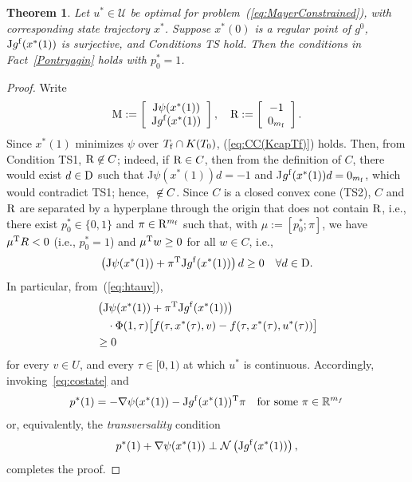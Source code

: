 \documentclass[letterpaper,10pt,conference]{ieeeconf}
\def\R{{\mathbb{R}}}
\newtheorem{theorem}{Theorem} %
\begin{document}
\noindent
\begin{theorem}
\label{thm:abnormal}
Let $u^*\in\mathcal U$ be optimal for problem~(\ref{eq:MayerConstrained}), 
with corresponding state trajectory $x^*$.   
Suppose $x^*(0)$ is a regular point of $g^0$, ${\rm J}g^{\rm f}(x^*(1))$
is surjective, and Conditions TS hold.  
Then the conditions in Fact~\ref{Pontryagin} holds with $p_0^*=1$.
\end{theorem}

\begin{proof}
Write 
\[
{\rm M}:= \left[
      \begin{array}{c} {\rm J}\psi(x^*(1))  \\
                  {\rm J}g^{\rm f}(x^*(1))
      \end{array} \right],
\quad
{\rm R}:= \left[ \begin{array}{c} -1 \\  0_{m_{\rm f}} \end{array} \right].
\]
Since $x^*(1)$ minimizes $\psi$ over $T_{\rm f}\cap K(T_0)$,
(\ref{eq:CC(KcapTf)}) holds.
Then, from Condition TS1, ${\rm R}\not\in C$;
indeed, if ${\rm R}\in C$, then from the definition of $C$, 
there would exist $d\in{\rm D}$ %
such that J$\psi(x^*(1))d=-1$ and 
J$g^{\rm f}(x^*(1))d=0_{m_{\rm f}}$,
which would contradict TS1; hence, ${\rm }\not\in C$.
Since $C$ is a closed convex cone (TS2), $C$ and $\rm R$ are separated
by a hyperplane through the origin that does not contain $\rm R$, 
i.e., there exist 
$p_0^*\in\{0,1\}$ and $\pi\in{\rm R}^{m_{\rm f}}$ such that,
with $\mu:=[p_0^*;\pi]$, we have
$\mu^{\rm T}{\rm }R<0$ (i.e., $p_0^*=1$) 
and $\mu^{\rm T} w\geq0$ for all
$w\in C$, i.e.,
\[
\left({\rm J}\psi(x^*(1))+\pi^{\rm T}{\rm J}g^{\rm f}(x^*(1))\right)
d \geq 0 \quad\forall d\in {\rm D}.
\]
In particular,
from~(\ref{eq:htauv}), 
\[
\begin{aligned}
&\left({\rm J}\psi(x^*(1))+\pi^{\rm T}{\rm J}g^{\rm f}(x^*(1))\right)\\
&\quad\cdot\Phi(1,\tau)\bigl[f(\tau,x^*(\tau),v)-f(\tau,x^*(\tau),u^*(\tau))\bigr]\\
&\geq0
\end{aligned}
\]
for every $v\in U$, and every $\tau\in[0,1)$ at which $u^*$ is continuous.
Accordingly, 
invoking~\eqref{eq:costate} and
\[
p^*(1) =-\nabla\psi(x^*(1))
-{\rm J}g^{\rm f}(x^*(1))^{\rm T}\pi \quad{\rm for~some}~\pi\in\R^{m_f}
\]
or, equivalently, the {\em transversality} condition
\[
p^*(1)+\nabla\psi(x^*(1))
\perp {\mathcal N}\left({\rm J}g^{\rm f}(x^*(1))\right),
\]
completes the proof.
\end{proof}
\end{document}
